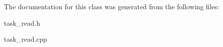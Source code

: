 The documentation for this class was generated from the following files\-:\begin{DoxyCompactItemize}
\item 
task\-\_\-read.\-h\item 
task\-\_\-read.\-cpp\end{DoxyCompactItemize}
